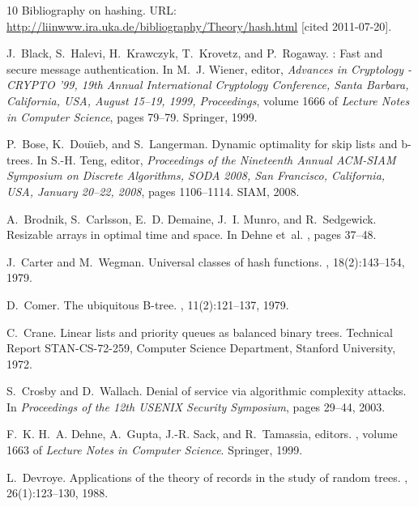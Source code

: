 \documentclass[10pt]{book}
\theoremstyle{plain}
\theoremstyle{definition}
\begin{document}
\begin{thebibliography}{10}
Bibliography on hashing.
\newblock URL: \url{http://liinwww.ira.uka.de/bibliography/Theory/hash.html}
  [cited 2011-07-20].

J.~Black, S.~Halevi, H.~Krawczyk, T.~Krovetz, and P.~Rogaway.
: Fast and secure message authentication.
\newblock In M.~J. Wiener, editor, {\em Advances in Cryptology - CRYPTO '99,
  19th Annual International Cryptology Conference, Santa Barbara, California,
  USA, August 15--19, 1999, Proceedings}, volume 1666 of {\em Lecture Notes in
  Computer Science}, pages 79--79. Springer, 1999.

P.~Bose, K.~Dou\"{\i}eb, and S.~Langerman.
\newblock Dynamic optimality for skip lists and b-trees.
\newblock In S.-H. Teng, editor, {\em Proceedings of the Nineteenth Annual
  ACM-SIAM Symposium on Discrete Algorithms, SODA 2008, San Francisco,
  California, USA, January 20--22, 2008}, pages 1106--1114. SIAM, 2008.

A.~Brodnik, S.~Carlsson, E.~D. Demaine, J.~I. Munro, and R.~Sedgewick.
\newblock Resizable arrays in optimal time and space.
\newblock In Dehne et~al. \cite{wads99proc}, pages 37--48.

J.~Carter and M.~Wegman.
\newblock Universal classes of hash functions.
, 18(2):143--154, 1979.

D.~Comer.
\newblock The ubiquitous {B}-tree.
, 11(2):121--137, 1979.

C.~Crane.
\newblock Linear lists and priority queues as balanced binary trees.
\newblock Technical Report STAN-CS-72-259, Computer Science Department,
  Stanford University, 1972.

S.~Crosby and D.~Wallach.
\newblock Denial of service via algorithmic complexity attacks.
\newblock In {\em Proceedings of the 12th USENIX Security Symposium}, pages
  29--44, 2003.

F.~K. H.~A. Dehne, A.~Gupta, J.-R. Sack, and R.~Tamassia, editors.
,
  volume 1663 of {\em Lecture Notes in Computer Science}. Springer, 1999.

L.~Devroye.
\newblock Applications of the theory of records in the study of random trees.
, 26(1):123--130, 1988.


\end{thebibliography}
\end{document}
